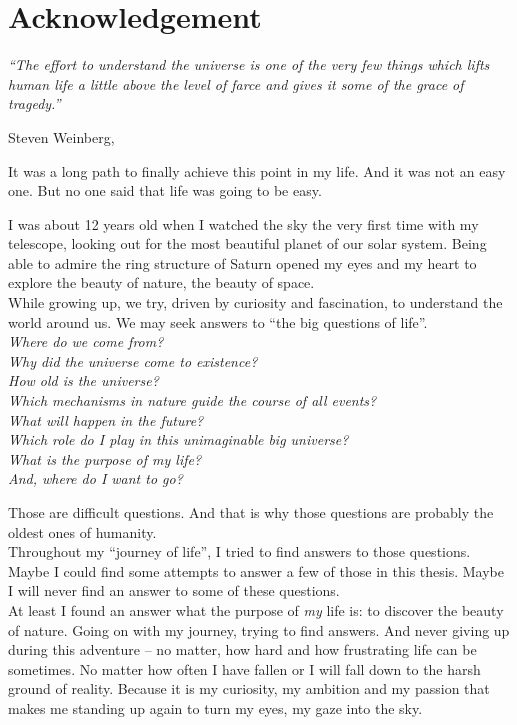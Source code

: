 \chapter*{Acknowledgement}
\thispagestyle{empty}

\epigraph{\textit{``The effort to understand the universe is one of the very few things which lifts human life a little above the level of farce and gives it some of the grace of tragedy.''}}{Steven Weinberg, \cite[Epilogue]{Weinberg1993}}

\noindent It was a long path to finally achieve this point in my life. And it was not an easy one. But no one said that life was going to be easy.

\noindent I was about 12 years old when I watched the sky the very first time with my telescope, looking out for the most beautiful planet of our solar system. Being able to admire the ring structure of Saturn opened my eyes and my heart to explore the beauty of nature, the beauty of space. \\

\noindent While growing up, we try, driven by curiosity and fascination, to understand the world around us. We may seek answers to ``the big questions of life''. \\ 

{ \itshape
\noindent Where do we come from? \\
Why did the universe come to existence? \\
How old is the universe? \\
Which mechanisms in nature guide the course of all events? \\
What will happen in the future? \\
Which role do I play in this unimaginable big universe? \\
What is the purpose of my life? \\
And, where do I want to go? \\
}

\noindent Those are difficult questions. And that is why those questions are probably the oldest ones of humanity. \\
Throughout my ``journey of life'', I tried to find answers to those questions. Maybe I could find some attempts to answer a few of those in this thesis. Maybe I will never find an answer to some of these questions. \\

\noindent At least I found an answer what the purpose of \textit{my} life is: to discover the beauty of nature. Going on with my journey, trying to find answers. And never giving up during this adventure -- no matter, how hard and how frustrating life can be sometimes. No matter how often I have fallen or I will fall down to the harsh ground of reality. Because it is my curiosity, my ambition and my passion that makes me standing up again to turn my eyes, my gaze into the sky. \\ 

